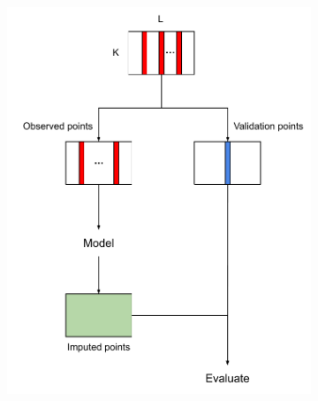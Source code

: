 \documentclass[review]{elsarticle}
\begin{document}
\begin{figure}[H]
     \centering
      \begin{subfigure}[b]{0.45\textwidth}
		\centering
		\includegraphics[width=\textwidth]{figure/missing_at_time_points.pdf}
		\caption{}
		\label{fig: missing at time points}
	 \end{subfigure}
         \hfill
      \begin{subfigure}[b]{0.45\textwidth}

\end{subfigure}
\end{figure}
\end{document}
